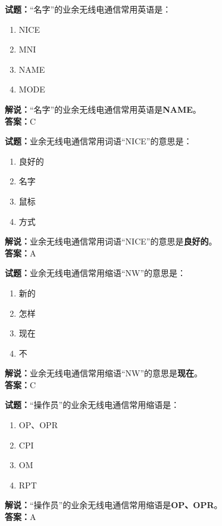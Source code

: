 \documentclass{ctexbook}
\begin{document}
\vspace{1em}

\textbf{试题：}“名字”的业余无线电通信常用英语是：
\begin{enumerate}[leftmargin=3em]
  \item NICE
  \item MNI
  \item NAME
  \item MODE
\end{enumerate}
\noindent\textbf{解说：}“名字”的业余无线电通信常用英语是\textbf{NAME}。\\
\noindent\textbf{答案：}C

\vspace{1em}

\textbf{试题：}业余无线电通信常用词语“NICE”的意思是：
\begin{enumerate}[leftmargin=3em]
  \item 良好的
  \item 名字
  \item 鼠标
  \item 方式
\end{enumerate}
\noindent\textbf{解说：}业余无线电通信常用词语“NICE”的意思是\textbf{良好的}。\\\noindent\textbf{答案：}A

\vspace{1em}

\textbf{试题：}业余无线电通信常用缩语“NW”的意思是：
\begin{enumerate}[leftmargin=3em]
  \item 新的
  \item 怎样
  \item 现在
  \item 不
\end{enumerate}
\noindent\textbf{解说：}业余无线电通信常用缩语“NW”的意思是\textbf{现在}。\\\noindent\textbf{答案：}C

\vspace{1em}

\textbf{试题：}“操作员”的业余无线电通信常用缩语是：
\begin{enumerate}[leftmargin=3em]
  \item OP、OPR
  \item CPI
  \item OM
  \item RPT
\end{enumerate}
\noindent\textbf{解说：}“操作员”的业余无线电通信常用缩语是\textbf{OP、OPR}。\\\noindent\textbf{答案：}A
\end{document}
